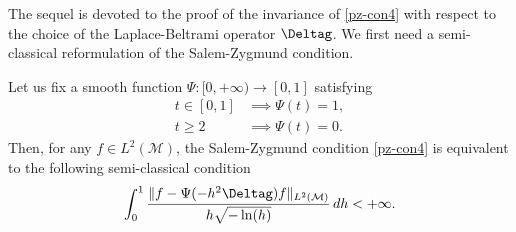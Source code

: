 The sequel is devoted to the proof of the invariance of \eqref{pz-con4} with respect to the choice of the Laplace-Beltrami operator $\Deltag$.
We first need a semi-classical reformulation of the Salem-Zygmund condition.

\begin{lemm}\label{wrt1}
Let us fix a smooth function $\Psi:[0,+\infty)\to [0,1]$ satisfying
\begin{equation}\label{est-sig}
\begin{split}
t \in [0,1] & \implies \Psi(t)=1, \\
t \geq 2 & \implies \Psi(t)=0.
\end{split}
\end{equation}
Then, for any $f\in L^2(\mathcal{M})$, the Salem-Zygmund condition \eqref{pz-con4} is equivalent to the following semi-classical condition
\begin{equation}\label{pz-con-sc}
\int_{0}^1 \frac{\|f-\Psi(-h^2 \Deltag)f \|_{L^2(\mathcal{M})}}{h\sqrt{-\ln(h)}} \,dh<+\infty.
\end{equation}
\end{lemm}
